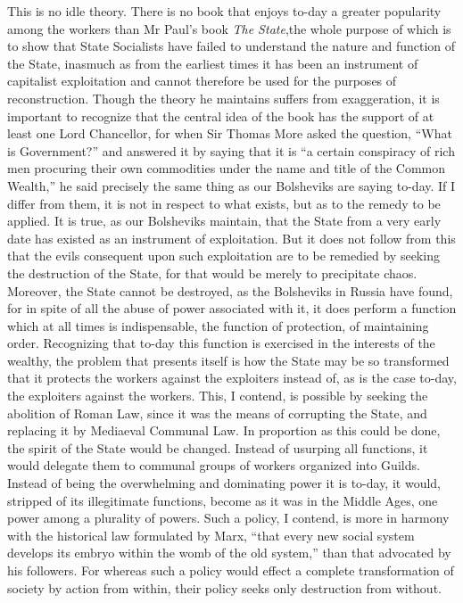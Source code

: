 \documentclass{book}
\begin{document}
This is no idle theory. There is no book that enjoys to-day a greater popularity among the workers than Mr Paul’s book \emph{The State},\footnotemark[5] the whole purpose of which is to show that State Socialists have failed to understand the nature and function of the State, inasmuch as from the earliest times it has been an instrument of capitalist exploitation and cannot therefore be used for the purposes of reconstruction. Though the theory he maintains suffers from exaggeration, it is important to recognize that the central idea of the book has the support of at least one Lord Chancellor, for when Sir Thomas More asked the question, “What is Government?” and answered it by saying that it is “a certain conspiracy of rich men procuring their own commodities under the name and title of the Common Wealth,” he said precisely the same thing as our Bolsheviks are saying to-day. If I differ from them, it is not in respect to what exists, but as to the remedy to be applied. It is true, as our Bolsheviks maintain, that the State from a very early date has existed as an instrument of exploitation. But it does not follow from this that the evils consequent upon such exploitation are to be remedied by seeking the destruction of the State, for that would be merely to precipitate chaos. Moreover, the State cannot be destroyed, as the Bolsheviks in Russia have found, for in spite of all the abuse of power associated with it, it does perform a function which at all times is indispensable, the function of protection, of maintaining order. Recognizing that to-day this function is exercised in the interests of the wealthy, the problem that presents itself is how the State may be so transformed that it protects the workers against the exploiters instead of, as is the case to-day, the exploiters against the workers. This, I contend, is possible by seeking the abolition of Roman Law, since it was the means of corrupting the State, and replacing it by Mediaeval Communal Law. In proportion as this could be done, the spirit of the State would be changed. Instead of usurping all functions, it would delegate them to communal groups of workers organized into Guilds. Instead of being the overwhelming and dominating power it is to-day, it would, stripped of its illegitimate functions, become as it was in the Middle Ages, one power among a plurality of powers. Such a policy, I contend, is more in harmony with the historical law formulated by Marx, “that every new social system develops its embryo within the womb of the old system,” than that advocated by his followers. For whereas such a policy would effect a complete transformation of society by action from within, their policy seeks only destruction from without.
\end{document}
